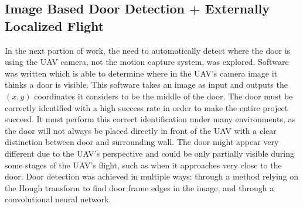 \documentclass[12pt]{article}
\begin{document}
\subsection{Image Based Door Detection + Externally Localized Flight}
In the next portion of work, the need to automatically detect where the door is using the UAV camera, not the motion capture system, was explored. Software was written which is able to determine where in the UAV's camera image it thinks a door is visible. This software takes an image as input and outputs the $(x,y)$ coordinates it considers to be the middle of the door. The door must be correctly identified with a high success rate in order to make the entire project succeed. It must perform this correct identification under many environments, as the door will not always be placed directly in front of the UAV with a clear distinction between door and surrounding wall. The door might appear very different due to the UAV's perspective and could be only partially visible during some stages of the UAV's flight, such as when it approaches very close to the door. Door detection was achieved in multiple ways: through a method relying on the Hough transform to find door frame edges in the image, and through a convolutional neural network.
\end{document}
